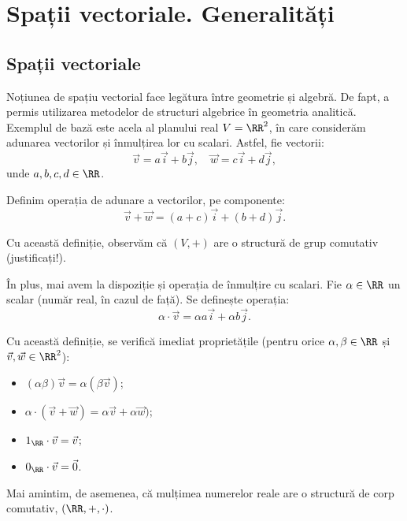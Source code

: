 \chapter{Spații vectoriale. Generalități}



\section{Spații vectoriale}

Noțiunea de spațiu vectorial face legătura între geometrie și algebră. De fapt,
a permis utilizarea metodelor de structuri algebrice în geometria analitică.
Exemplul de bază este acela al planului real $ V = \RR^2 $, în care considerăm
adunarea vectorilor și înmulțirea lor cu scalari. Astfel, fie vectorii:
\[
  \vec{v} = a\vec{i} + b \vec{j}, \quad \vec{w} = c \vec{i} + d \vec{j},
\]
unde $ a, b, c, d \in \RR $.

Definim operația de adunare a vectorilor, pe componente:
\[
  \vec{v} + \vec{w} = (a + c)\vec{i} + (b + d) \vec{j}.
\]

Cu această definiție, observăm că $ (V, +) $ are o structură de grup comutativ
(justificați!).

În plus, mai avem la dispoziție și operația de înmulțire cu scalari. Fie $ \alpha \in \RR $
un scalar (număr real, în cazul de față). Se definește operația:
\[
  \alpha \cdot \vec{v} = \alpha a \vec{i} + \alpha b \vec{j}.
\]

Cu această definiție, se verifică imediat proprietățile (pentru orice $ \alpha, \beta \in \RR $
și $ \vec{v}, \vec{w} \in \RR^2 $):
\begin{itemize}
\item $ (\alpha \beta)\vec{v} = \alpha (\beta \vec{v}) $;
\item $ \alpha \cdot (\vec{v} + \vec{w}) = \alpha \vec{v} + \alpha \vec{w}) $;
\item $ 1_\RR \cdot \vec{v} = \vec{v} $;
\item $ 0_\RR \cdot \vec{v} = \vec{0} $.
\end{itemize}

Mai amintim, de asemenea, că mulțimea numerelor reale are o structură de corp comutativ,
$ (\RR, +, \cdot) $.


